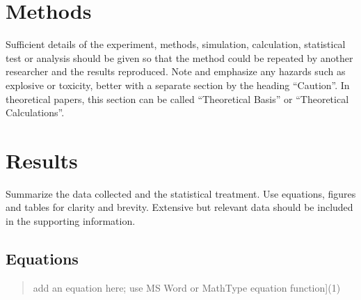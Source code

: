 \documentclass{ELSP}
\begin{document}



\section{Methods}

Sufficient details of the experiment, methods, simulation, calculation,
statistical test or analysis should be given so that the method could be
repeated by another researcher and the results reproduced. Note and
emphasize any hazards such as explosive or toxicity, better with a
separate section by the heading ``Caution''. In theoretical papers, 
this section can be called ``Theoretical Basis'' or ``Theoretical
Calculations''.

\section{Results}

Summarize the data collected and the statistical treatment. Use
equations, figures and tables for clarity and brevity. Extensive but relevant data should be included in the supporting information.

\subsection{Equations}


\begin{quote}

	\hspace{+5em}{[}add an equation here; use MS Word or MathType equation function{]}\hfill{(1)}

\end{quote}
\end{document}
